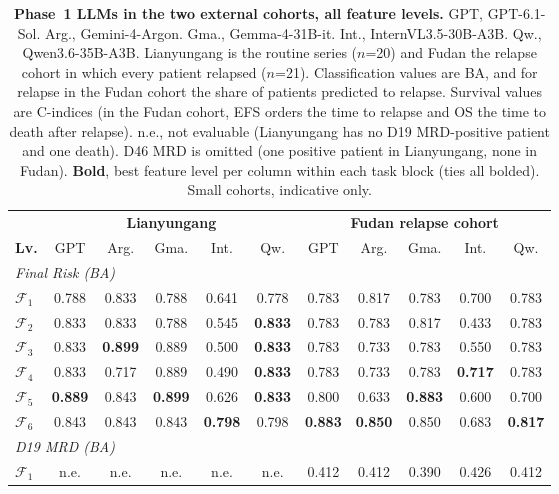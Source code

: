 \documentclass[pdflatex,sn-nature]{sn-jnl}
\begin{document}
\begin{appendices}
\clearpage

\begin{table}[p]
\caption{\textbf{Phase~1 LLMs in the two external cohorts, all feature levels.} GPT, GPT-6.1-Sol. Arg., Gemini-4-Argon. Gma., Gemma-4-31B-it. Int., InternVL3.5-30B-A3B. Qw., Qwen3.6-35B-A3B. Lianyungang is the routine series ($n$=20) and Fudan the relapse cohort in which every patient relapsed ($n$=21). Classification values are BA, and for relapse in the Fudan cohort the share of patients predicted to relapse. Survival values are C-indices (in the Fudan cohort, EFS orders the time to relapse and OS the time to death after relapse). n.e., not evaluable (Lianyungang has no D19 MRD-positive patient and one death). D46 MRD is omitted (one positive patient in Lianyungang, none in Fudan). \textbf{Bold}, best feature level per column within each task block (ties all bolded). Small cohorts, indicative only.}
\label{tab:phase1_ext}
\centering
\footnotesize
\renewcommand{\arraystretch}{0.85}
\setlength{\tabcolsep}{3pt}
\begin{tabular}{@{}l ccccc ccccc@{}}
\toprule
 & \multicolumn{5}{c}{\textbf{Lianyungang}} & \multicolumn{5}{c}{\textbf{Fudan relapse cohort}} \\
\cmidrule(lr){2-6}\cmidrule(lr){7-11}
\textbf{Lv.} & GPT & Arg. & Gma. & Int. & Qw. & GPT & Arg. & Gma. & Int. & Qw. \\
\midrule
\multicolumn{11}{l}{\textit{Final Risk (BA)}} \\
$\mathcal{F}_1$ & 0.788 & 0.833 & 0.788 & 0.641 & 0.778 & 0.783 & 0.817 & 0.783 & 0.700 & 0.783 \\
$\mathcal{F}_2$ & 0.833 & 0.833 & 0.788 & 0.545 & \textbf{0.833} & 0.783 & 0.783 & 0.817 & 0.433 & 0.783 \\
$\mathcal{F}_3$ & 0.833 & \textbf{0.899} & 0.889 & 0.500 & \textbf{0.833} & 0.783 & 0.733 & 0.783 & 0.550 & 0.783 \\
$\mathcal{F}_4$ & 0.833 & 0.717 & 0.889 & 0.490 & \textbf{0.833} & 0.783 & 0.733 & 0.783 & \textbf{0.717} & 0.783 \\
$\mathcal{F}_5$ & \textbf{0.889} & 0.843 & \textbf{0.899} & 0.626 & \textbf{0.833} & 0.800 & 0.633 & \textbf{0.883} & 0.600 & 0.700 \\
$\mathcal{F}_6$ & 0.843 & 0.843 & 0.843 & \textbf{0.798} & 0.798 & \textbf{0.883} & \textbf{0.850} & 0.850 & 0.683 & \textbf{0.817} \\
\multicolumn{11}{l}{\textit{D19 MRD (BA)}} \\
$\mathcal{F}_1$ & n.e. & n.e. & n.e. & n.e. & n.e. & 0.412 & 0.412 & 0.390 & 0.426 & 0.412 \\

\end{tabular}
\end{table}
\end{appendices}
\end{document}
